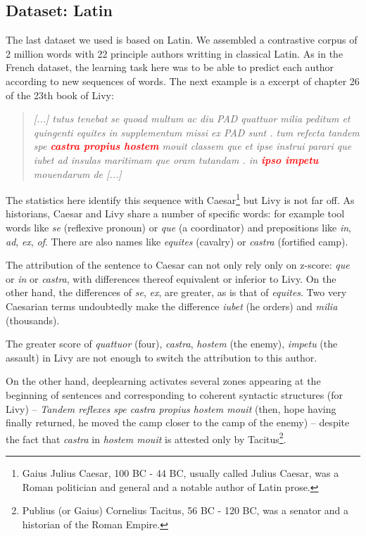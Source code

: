 \subsection{Dataset: Latin}

The last dataset we used is based on Latin. We assembled a contrastive corpus of 2 million words with 22 principle authors writting in classical Latin. As in the French dataset, the learning task here was to be able to predict each author according to new sequences of words. The next example is a excerpt of chapter 26 of the 23th book of Livy:

\begin{quote}
\textit{[...] tutus tenebat se quoad multum ac diu PAD quattuor milia peditum et quingenti equites in supplementum missi ex PAD sunt . tum refecta tandem spe \textcolor{red}{\textbf{castra propius hostem}} mouit classem que et ipse instrui parari que iubet ad insulas maritimam que oram tutandam . in \textcolor{red}{\textbf{ipso impetu}} mouendarum de [...]} 
\end{quote}

The statistics here identify this sequence with Caesar\footnote{Gaius Julius Caesar, 100 BC - 44 BC, usually called Julius Caesar, was a Roman politician and general and a notable author of Latin prose.} but Livy is not far off. As historians, Caesar and Livy share a number of specific words: for example tool words like \textit{se} (reflexive pronoun) or \textit{que} (a coordinator) and prepositions like \textit{in}, \textit{ad}, \textit{ex}, \textit{of}. There are also names like \textit{equites} (cavalry) or \textit{castra} (fortified camp).

The attribution of the sentence to Caesar can not only rely only on z-score: \textit{que} or \textit{in} or \textit{castra}, with differences thereof equivalent or inferior to Livy. On the other hand, the differences of \textit{se}, \textit{ex}, are greater, as is that of \textit{equites}. Two very Caesarian terms undoubtedly make the difference \textit{iubet} (he orders) and \textit{milia} (thousands).

The greater score of \textit{quattuor} (four), \textit{castra}, \textit{hostem} (the enemy), \textit{impetu} (the assault) in Livy are not enough to switch the attribution to this author.

On the other hand, deeplearning activates several zones appearing at the beginning of sentences and corresponding to coherent syntactic structures (for Livy) -- \textit{Tandem reflexes spe castra propius hostem mouit} (then, hope having finally returned, he moved the camp closer to the camp of the enemy) -- despite the fact that \textit{castra} in \textit{hostem mouit} is attested only by Tacitus\footnote{Publius (or Gaius) Cornelius Tacitus, 56 BC - 120 BC, was a senator and a historian of the Roman Empire.}. 

